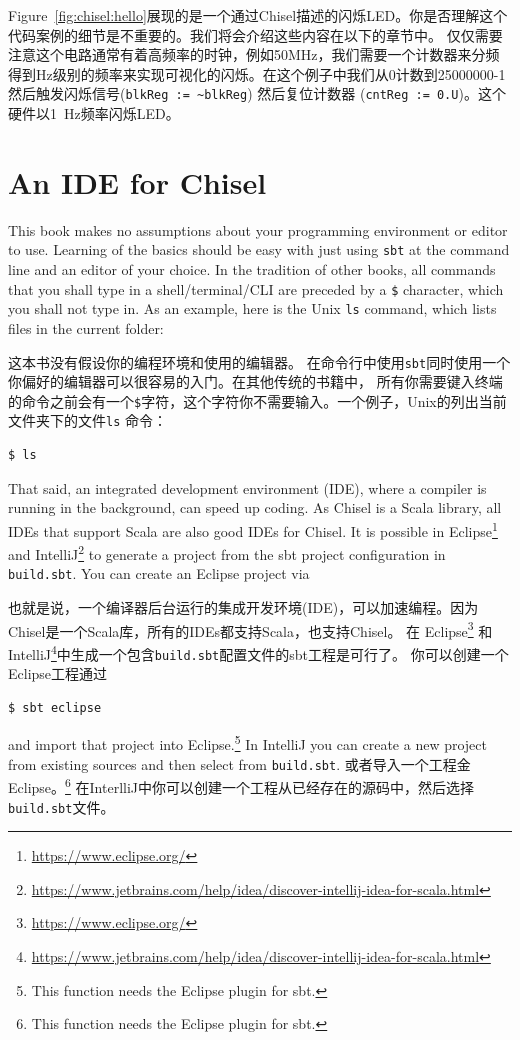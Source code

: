 \documentclass[%
    10pt,
    headinclude, footexclude,
    openright, %
    notitlepage,
    cleardoubleempty,
    headsepline,
    pointlessnumbers,
    bibtotoc, idxtotoc,
    ]{scrbook}
\newcommand{\code}[1]{{\small{\texttt{#1}}}}
\newcommand{\myref}[2]{\href{#1}{#2}}
\renewcommand{\myref}[2]{{#2}{\footnote{\url{#1}}}}
\begin{document}
Figure~\ref{fig:chisel:hello}展现的是一个通过Chisel描述的闪烁LED。你是否理解这个代码案例的细节是不重要的。我们将会介绍这些内容在以下的章节中。
仅仅需要注意这个电路通常有着高频率的时钟，例如50MHz，我们需要一个计数器来分频得到Hz级别的频率来实现可视化的闪烁。在这个例子中我们从0计数到25000000-1然后触发闪烁信号(\code{blkReg := \textasciitilde blkReg}) 
然后复位计数器 (\code{cntReg := 0.U})。这个硬件以1~Hz频率闪烁LED。

\section{An IDE for Chisel}

This book makes no assumptions about your programming environment or editor to use.
Learning of the basics should be easy with just using \code{sbt} at the command line
and an editor of your choice. In the tradition of other books, all commands that you
shall type in a shell/terminal/CLI are preceded by a \code{\$} character, which you
shall not type in. As an example, here is the Unix \code{ls} command, which lists files in
the current folder:

这本书没有假设你的编程环境和使用的编辑器。
在命令行中使用\code{sbt}同时使用一个你偏好的编辑器可以很容易的入门。在其他传统的书籍中，
所有你需要键入终端的命令之前会有一个\code{\$}字符，这个字符你不需要输入。一个例子，Unix的列出当前文件夹下的文件\code{ls}
命令：

\begin{verbatim}
$ ls
\end{verbatim}

That said, an integrated development environment (IDE), where a compiler is running in
the background, can speed up coding. As Chisel is a Scala library, all IDEs
that support Scala are also good IDEs for Chisel.
It is possible in \myref{https://www.eclipse.org/}{Eclipse} and
\myref{https://www.jetbrains.com/help/idea/discover-intellij-idea-for-scala.html}{IntelliJ}
to generate a project from the sbt project configuration in \code{build.sbt}.
You can create an Eclipse project via

也就是说，一个编译器后台运行的集成开发环境(IDE)，可以加速编程。因为Chisel是一个Scala库，所有的IDEs都支持Scala，也支持Chisel。
在 \myref{https://www.eclipse.org/}{Eclipse} 和
\myref{https://www.jetbrains.com/help/idea/discover-intellij-idea-for-scala.html}{IntelliJ}中生成一个包含\code{build.sbt}配置文件的sbt工程是可行了。
你可以创建一个Eclipse工程通过

\begin{verbatim}
$ sbt eclipse
\end{verbatim}
and import that project into Eclipse.\footnote{This function needs the Eclipse plugin for sbt.}
In IntelliJ you can create a new project from existing sources and then select from \code{build.sbt}.
或者导入一个工程金Eclipse。\footnote{This function needs the Eclipse plugin for sbt.}
在InterlliJ中你可以创建一个工程从已经存在的源码中，然后选择\code{build.sbt}文件。
\end{document}
